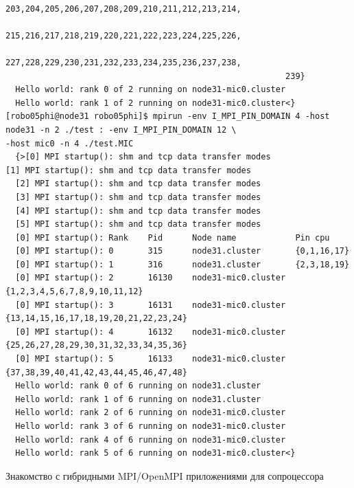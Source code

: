 \documentclass[pscyr,10pt]{hedlab}
\begin{document}
\begin{lstlisting}
                                                         203,204,205,206,207,208,209,210,211,212,213,214,
                                                         215,216,217,218,219,220,221,222,223,224,225,226,
                                                         227,228,229,230,231,232,233,234,235,236,237,238,
                                                         239}
  Hello world: rank 0 of 2 running on node31-mic0.cluster
  Hello world: rank 1 of 2 running on node31-mic0.cluster<}
[robo05phi@node31 robo05phi]$ mpirun -env I_MPI_PIN_DOMAIN 4 -host node31 -n 2 ./test : -env I_MPI_PIN_DOMAIN 12 \
-host mic0 -n 4 ./test.MIC
  {>[0] MPI startup(): shm and tcp data transfer modes
[1] MPI startup(): shm and tcp data transfer modes
  [2] MPI startup(): shm and tcp data transfer modes
  [3] MPI startup(): shm and tcp data transfer modes
  [4] MPI startup(): shm and tcp data transfer modes
  [5] MPI startup(): shm and tcp data transfer modes
  [0] MPI startup(): Rank    Pid      Node name            Pin cpu
  [0] MPI startup(): 0       315      node31.cluster       {0,1,16,17}
  [0] MPI startup(): 1       316      node31.cluster       {2,3,18,19}
  [0] MPI startup(): 2       16130    node31-mic0.cluster  {1,2,3,4,5,6,7,8,9,10,11,12}
  [0] MPI startup(): 3       16131    node31-mic0.cluster  {13,14,15,16,17,18,19,20,21,22,23,24}
  [0] MPI startup(): 4       16132    node31-mic0.cluster  {25,26,27,28,29,30,31,32,33,34,35,36}
  [0] MPI startup(): 5       16133    node31-mic0.cluster  {37,38,39,40,41,42,43,44,45,46,47,48}
  Hello world: rank 0 of 6 running on node31.cluster
  Hello world: rank 1 of 6 running on node31.cluster
  Hello world: rank 2 of 6 running on node31-mic0.cluster
  Hello world: rank 3 of 6 running on node31-mic0.cluster
  Hello world: rank 4 of 6 running on node31-mic0.cluster
  Hello world: rank 5 of 6 running on node31-mic0.cluster<}
\end{lstlisting}

  \begin{center}
    Знакомство с гибридными MPI/OpenMPI приложениями для сопроцессора
  \end{center}
\end{document}
